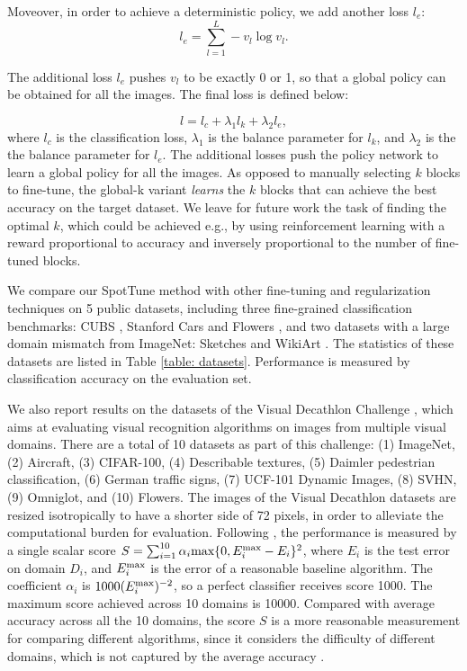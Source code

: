 \documentclass[10pt,twocolumn,letterpaper]{article}
\begin{document}
Moveover, in order to achieve a deterministic policy, we add another loss $l_{e}$:
\begin{equation}
    l_{e} = \sum_{l=1}^L -v_l\log v_l.
\end{equation}

The additional loss $l_{e}$ pushes $v_l$ to be exactly 0 or 1, so that a global policy can be obtained for all the images. The final loss is defined below:

\begin{equation}
    l = l_c + \lambda_1 l_{k} + \lambda_2 l_{e},
\end{equation}\noindent where $l_c$ is the classification loss, $\lambda_1$ is the balance parameter for $l_{k}$, and $\lambda_2$ is the the balance parameter for $l_{e}$. The additional losses push the policy network to learn a global policy for all the images. %
As opposed to manually selecting $k$ blocks to fine-tune, the global-k variant {\em learns} the $k$ blocks that can achieve the best accuracy on the target dataset. We leave for future work the task of finding the optimal $k$, which could be achieved e.g., by using reinforcement learning with a reward proportional to accuracy and inversely proportional to the number of fine-tuned blocks.

We compare our SpotTune method with other fine-tuning and regularization techniques on 5 public datasets, including three fine-grained classification benchmarks: CUBS \cite{wah2011caltech}, Stanford Cars \cite{krause20133d} and Flowers \cite{nilsback2008automated}, and two datasets with a large domain mismatch from ImageNet: Sketches \cite{eitz2012humans} and WikiArt \cite{saleh2015large}. The statistics of these datasets are listed in Table \ref{table: datasets}. Performance is measured by classification accuracy on the evaluation set.

We also report results on the datasets of the Visual Decathlon Challenge \cite{rebuffi2017learning}, which aims at evaluating visual recognition algorithms on images from multiple visual domains. There are a total of 10 datasets as part of this challenge: (1) ImageNet, (2) Aircraft, (3) CIFAR-100, (4)  Describable textures, (5) Daimler pedestrian classification, (6) German traffic signs, (7) UCF-101 Dynamic Images, (8) SVHN, (9) Omniglot, and (10) Flowers. The images of the Visual Decathlon datasets are resized isotropically to have a shorter side of 72 pixels, in order to alleviate the computational burden for evaluation.  
Following \cite{rebuffi2017learning}, the performance is measured by a single scalar score $S = \sum_{i=1}^{10}\alpha_i \textnormal{max}\{0, E_i^{\textnormal{max}}-E_i\}^2$, 
where $E_i$ is the test error on domain $D_i$, and $E_i^{\textnormal{max}}$ is the error of a reasonable baseline algorithm. The coefficient $\alpha_{i}$ is  $1000(E_i^{\textnormal{max}})^{-2}$, so a perfect classifier receives score 1000. The maximum score achieved across 10 domains is 10000. Compared with average accuracy across all the 10 domains, the score $S$ is a more reasonable measurement for comparing different algorithms, since it considers the difficulty of different domains, which is not captured by the average accuracy \cite{rebuffi2017learning}.
\end{document}
